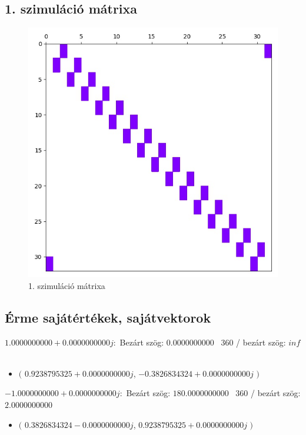 \documentclass[14pt,a4paper]{article}
\begin{document}
\subsection{1. szimuláció mátrixa}
\begin{figure}[H]
\centering
\includegraphics[width = 0.7\columnwidth]{sim_01/simulation_matrix.jpg}
\caption{1. szimuláció mátrixa}
\end{figure}
\subsection{Érme sajátértékek, sajátvektorok}
$1.0000000000+0.0000000000j$:\
Bezárt szög: $0.0000000000$ \
360 / bezárt szög: $inf$\
\begin{itemize}
\item
$\big($
$0.9238795325+0.0000000000j$, $-0.3826834324+0.0000000000j$
$\big)$
\end{itemize}
$-1.0000000000+0.0000000000j$:\
Bezárt szög: $180.0000000000$ \
360 / bezárt szög: $2.0000000000$\
\begin{itemize}
\item
$\big($
$0.3826834324-0.0000000000j$, $0.9238795325+0.0000000000j$
$\big)$
\end{itemize}
\end{document}
